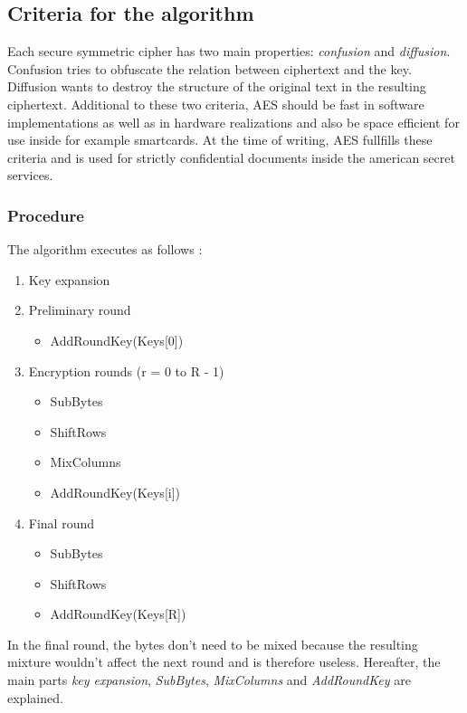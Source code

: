 \subsection{Criteria for the algorithm}

Each secure symmetric cipher has two main properties:
\textit{confusion} and \textit{diffusion}. Confusion tries to obfuscate
the relation between ciphertext and the key. Diffusion wants to
destroy the structure of the original text in the resulting ciphertext.
Additional to these two criteria, AES should be fast in software implementations
as well as in hardware realizations and also be space efficient for use
inside for example smartcards. At the time of writing, AES fullfills these
criteria and is used for strictly confidential documents inside the american
secret services.

\subsubsection{Procedure}

The algorithm executes as follows \cite{wikipedia_aes}:
\begin{enumerate}
  \item Key expansion
  \item Preliminary round
    \begin{itemize}
      \item AddRoundKey(Keys[0])
    \end{itemize}
  \item Encryption rounds (r = 0 to R - 1)
    \begin{itemize}
      \item SubBytes
      \item ShiftRows
      \item MixColumns
      \item AddRoundKey(Keys[i]) 
    \end{itemize}
  \item Final round
    \begin{itemize}
      \item SubBytes
      \item ShiftRows
      \item AddRoundKey(Keys[R]) 
    \end{itemize}
\end{enumerate}

In the final round, the bytes don't need to be mixed because the resulting
mixture wouldn't affect the next round and is therefore useless.
Hereafter, the main parts \textit{key expansion}, \textit{SubBytes},
\textit{MixColumns} and \textit{AddRoundKey} are explained.

